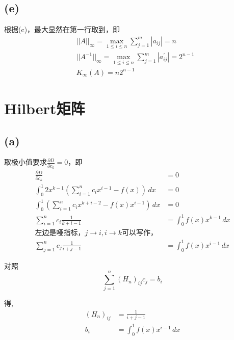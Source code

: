 \documentclass[UTF8]{ctexart}
\begin{document}
\subsection*{(e)}
根据(c)，最大显然在第一行取到，即
\begin{equation*}
    \begin{aligned}
        &||A||_\infty=\max_{1\leq i\leq n}\sum_{j=1}^{m}|a_{ij}|=n\\
        &||A^{-1}||_\infty=\max_{1\leq i\leq n}\sum_{j=1}^{m}|a^\prime_{ij}|=2^{n-1} \\
        &K_\infty(A)=n2^{n-1}
    \end{aligned}
\end{equation*}

\section{Hilbert矩阵}
\subsection*{(a)}
取极小值要求$\frac{\partial D}{\partial c_k}=0$，即
\begin{equation*}
    \begin{aligned}
        \frac{\partial D}{\partial c_k}&=0\\
        \int_{0}^{1} 2x^{k-1}\left(\sum_{i=1}^{n}c_i x^{i-1}-f(x)\right)\,dx &=0\\
        \int_{0}^{1} \left(\sum_{i=1}^{n}c_i x^{k+i-2}-f(x)x^{i-1}\right)\,dx &=0\\
        \sum_{i=1}^{n}c_i\frac{1}{k+i-1}&=\int_{0}^{1} f(x)x^{k-1} \,dx \\
        \text{左边是哑指标，}j\to i,i\to k\text{可以写作，}\\
        \sum_{j=1}^{n}c_j\frac{1}{i+j-1}&=\int_{0}^{1} f(x)x^{i-1} \,dx
    \end{aligned}
\end{equation*}

对照\begin{equation*}
    \sum_{j=1}^{n}(H_n)_{ij}c_{j}=b_i 
\end{equation*}

得,
\begin{equation*}
    \begin{aligned}
        (H_n)_{ij}&=\frac{1}{i+j-1}\\
        b_i&=\int_{0}^{1} f(x)x^{i-1} \,dx
    \end{aligned}
\end{equation*}
\end{document}
